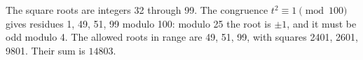 The square roots are integers 32 through 99. The congruence $t^2\equiv1\pmod{100}$ gives residues 1, 49, 51, 99 modulo 100: modulo 25 the root is $\pm1$, and it must be odd modulo 4. The allowed roots in range are 49, 51, 99, with squares 2401, 2601, 9801. Their sum is $\boxed{14803}$.
